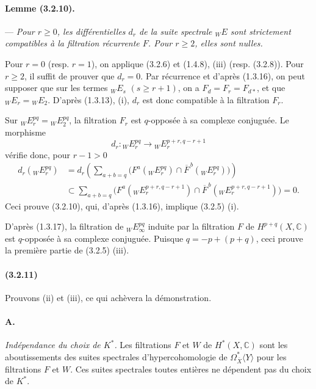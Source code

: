 \documentclass[10pt]{article}
\newcommand{\C}{\mathbb C}
\begin{document}
\paragraph{Lemme (3.2.10).} --- {\itshape Pour $r\ge0$, les différentielles $d_r$ de la suite spectrale ${}_WE$ sont strictement compatibles à la filtration récurrente $F$. Pour $r\ge2$, elles sont nulles.}

Pour $r=0$ (resp. $r=1$), on applique (3.2.6) et (1.4.8), (iii) (resp. (3.2.8)). Pour $r\ge2$, il suffit de prouver que $d_r=0$. Par récurrence et d'après (1.3.16), on peut supposer que sur les termes ${}_WE_s$ $(s\ge r+1)$, on a $F_d=F_r=F_{d*}$, et que ${}_WE_r={}_WE_2$. D'après (1.3.13), (i), $d_r$ est donc compatible à la filtration $F_r$.

Sur ${}_WE_r^{pq}={}_WE_2^{pq}$, la filtration $F_r$ est $q$-opposée à sa complexe conjuguée. Le morphisme
\[
d_r:{}_W E_r^{pq}\longrightarrow {}_W E_r^{p+r,q-r+1}
\]
vérifie donc, pour $r-1>0$
\[
\begin{aligned}
d_r({}_W E_r^{pq})
&=d_r\!\left(\sum_{a+b=q}\bigl(F^a({}_W E_r^{pq})\cap
\overline F^{\,b}({}_W E_r^{pq})\bigr)\right)\\
&\subset
\sum_{a+b=q}\bigl(F^a({}_WE_r^{p+r,q-r+1})\cap
\overline F^{\,b}({}_WE_r^{p+r,q-r+1})\bigr)=0.
\end{aligned}
\]
Ceci prouve (3.2.10), qui, d'après (1.3.16), implique (3.2.5) (i).

D'après (1.3.17), la filtration de ${}_WE_\infty^{pq}$ induite par la filtration $F$ de $H^{p+q}(X,\C)$ est $q$-opposée à sa complexe conjuguée. Puisque $q=-p+(p+q)$, ceci prouve la première partie de (3.2.5) (iii).

\paragraph{(3.2.11)} Prouvons (ii) et (iii), ce qui achèvera la démonstration.

\paragraph{A.} \textit{Indépendance du choix de $K^{*}$.} Les filtrations $F$ et $W$ de $H^*(X,\C)$ sont les aboutissements des suites spectrales d'hypercohomologie de $\Omega_{\overline X}^{*}\langle Y\rangle$ pour les filtrations $F$ et $W$. Ces suites spectrales toutes entières ne dépendent pas du choix de $K^{*}$.
\end{document}
